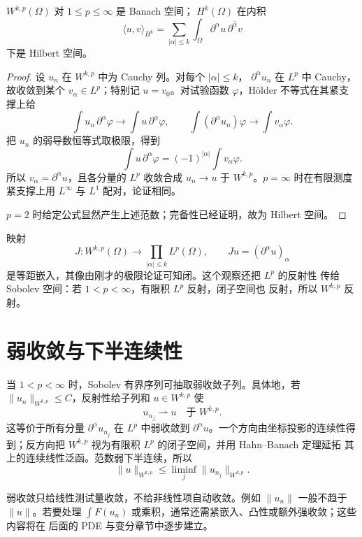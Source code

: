 \begin{theorem}\label{thm:sobolev-complete}
\(W^{k,p}(\Omega)\) 对 \(1\le p\le\infty\) 是 Banach 空间；
\(H^k(\Omega)\) 在内积
\[
 \langle u,v\rangle_{H^k}
 =\sum_{|\alpha|\le k}\int_\Omega
 \partial^\alpha u\,\overline{\partial^\alpha v}
\]
下是 Hilbert 空间。
\end{theorem}
\begin{proof}
设 \(u_n\) 在 \(W^{k,p}\) 中为 Cauchy 列。对每个 \(|\alpha|\le k\)，
\(\partial^\alpha u_n\) 在 \(L^p\) 中 Cauchy，故收敛到某个
\(v_\alpha\in L^p\)；特别记 \(u=v_0\)。对试验函数 \(\varphi\)，Hölder
不等式在其紧支撑上给
\[
 \int u_n\,\partial^\alpha\varphi\to
 \int u\,\partial^\alpha\varphi,\qquad
 \int(\partial^\alpha u_n)\varphi\to\int v_\alpha\varphi.
\]
把 \(u_n\) 的弱导数恒等式取极限，得到
\[
 \int u\,\partial^\alpha\varphi
 =(-1)^{|\alpha|}\int v_\alpha\varphi.
\]
所以 \(v_\alpha=\partial^\alpha u\)，且各分量的 \(L^p\) 收敛合成
\(u_n\to u\) 于 \(W^{k,p}\)。\(p=\infty\) 时在有限测度紧支撑上用
\(L^\infty\) 与 \(L^1\) 配对，论证相同。

\(p=2\) 时给定公式显然产生上述范数；完备性已经证明，故为 Hilbert 空间。
\end{proof}

映射
\[
 J:W^{k,p}(\Omega)\to\prod_{|\alpha|\le k}L^p(\Omega),
 \qquad Ju=(\partial^\alpha u)_\alpha
\]
是等距嵌入，其像由刚才的极限论证可知闭。这个观察还把 \(L^p\) 的反射性
传给 Sobolev 空间：若 \(1<p<\infty\)，有限积 \(L^p\) 反射，闭子空间也
反射，所以 \(W^{k,p}\) 反射。

\section{弱收敛与下半连续性}

当 \(1<p<\infty\) 时，Sobolev 有界序列可抽取弱收敛子列。具体地，若
\(\|u_n\|_{W^{k,p}}\le C\)，反射性给子列和 \(u\in W^{k,p}\) 使
\[
 u_{n_j}\rightharpoonup u\quad\text{于 }W^{k,p}.
\]
这等价于所有分量 \(\partial^\alpha u_{n_j}\) 在 \(L^p\) 中弱收敛到
\(\partial^\alpha u\)。一个方向由坐标投影的连续性得到；反方向把
\(W^{k,p}\) 视为有限积 \(L^p\) 的闭子空间，并用 Hahn--Banach 定理延拓
其上的连续线性泛函。范数弱下半连续，所以
\begin{equation}\label{eq:sobolev-weak-lsc}
 \|u\|_{W^{k,p}}\le\liminf_j\|u_{n_j}\|_{W^{k,p}}.
\end{equation}

弱收敛只给线性测试量收敛，不给非线性项自动收敛。例如
\(\|u_n\|\) 一般不趋于 \(\|u\|\)。若要处理
\(\int F(u_n)\) 或乘积，通常还需紧嵌入、凸性或额外强收敛；这些内容将在
后面的 PDE 与变分章节中逐步建立。


